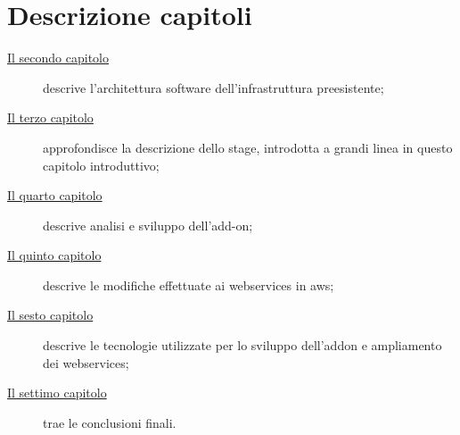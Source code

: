 \section{Descrizione capitoli}
\begin{description}
	\item[{\hyperref[cap:descrizione-architettura]{Il secondo capitolo}}] descrive l'architettura software dell'infrastruttura preesistente;
	
	\item[{\hyperref[cap:descrizione-stage]{Il terzo capitolo}}] approfondisce la descrizione dello stage, introdotta a grandi linea in questo capitolo introduttivo;
	
	\item[{\hyperref[cap:sviluppo-addon]{Il quarto capitolo}}] descrive analisi e sviluppo dell'add-on;
	
	\item[{\hyperref[cap:webservices]{Il quinto capitolo}}] descrive le modifiche effettuate ai webservices in \gls{aws};
	
	\item[{\hyperref[cap:tecnologie-coinvolte]{Il sesto capitolo}}] descrive le tecnologie utilizzate per lo sviluppo dell'addon e ampliamento dei webservices;
	
	\item[{\hyperref[cap:conclusioni]{Il settimo capitolo}}] trae le conclusioni finali.
\end{description}